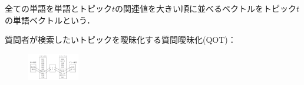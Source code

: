 \documentclass[papersize]{suribtabst}
\begin{document}
全ての単語を単語とトピック$t$の関連値を大きい順に並べるベクトルをトピック$t$の単語ベクトルという．

質問者が検索したいトピックを曖昧化する質問曖昧化(QOT)：
\begin{figure}[H]
\includegraphics[width=0.2\textwidth,natwidth=195.813,natheight=105.625]{QOT.pdf}
\end{figure}








\end{document}
